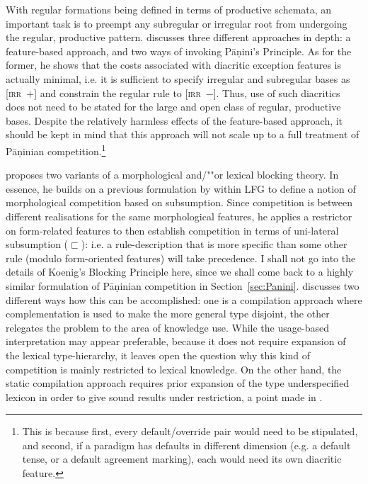 \documentclass[output=paper
                ,modfonts
                ,nonflat
	        ,collection
	        ,collectionchapter
	        ,collectiontoclongg
 	        ,biblatex
                ,babelshorthands
                ,newtxmath
                ,draftmode
                ,colorlinks, citecolor=brown
]{./langsci/langscibook}
\begin{document}
{With regular formations being defined in terms of productive schemata,
an important task is to preempt any subregular or irregular root from
undergoing the regular, productive pattern. \citet{Koenig99} discusses
three different approaches in depth: a feature-based approach, and two
ways of invoking Pāṇini's Principle. As for the former, he shows that
the costs associated with diacritic exception features is actually
minimal, i.e. it is sufficient to specify irregular and subregular
bases as \textsc{[irr~$+$]} and constrain the regular rule to
\textsc{[irr~$-$]}. Thus, use of such diacritics does not need to be
stated for the large and open class of regular, productive
bases. Despite the relatively harmless effects of the feature-based
approach, it should be kept in mind that this approach will not scale
up to a full treatment of Pāṇinian competition.\footnote{This is
  because first, every default/override pair would need to be
  stipulated, and second, if a paradigm has defaults in different
  dimension (e.g. a default tense, or a default agreement marking),
  each would need its own diacritic feature.}

\citet{Koenig99} proposes two variants of a morphological and/""or lexical blocking
theory. In essence, he builds on a previous formulation by
\citet{Andrews90} within LFG to define a notion of morphological
competition based on subsumption. Since competition is between
different realisations for the same morphological features, he applies
a restrictor on form-related features to then establish competition in
terms of uni-lateral subsumption ($\sqsubset$): i.e. a
rule-description that is more specific than some other rule (modulo
form-oriented features) will take precedence. I shall not go into the
details of Koenig's Blocking Principle here, since we shall come back
to a highly similar formulation of Pāṇinian competition in
Section~\ref{sec:Panini}.  \citet{Koenig99} discusses two different
ways how this can be accomplished: one is a compilation approach where
complementation is used to make the more general type disjoint, the
other relegates the problem to the area of knowledge use. While the
usage-based interpretation may appear preferable, because it does not
require expansion of the lexical type-hierarchy, it leaves open the
question why this kind of competition is mainly restricted to lexical
knowledge. On the other hand, the static compilation approach requires
prior expansion of the type underspecified lexicon in order to give
sound results under restriction, a point made in
\citet{crysmann_b03book}.

}
\end{document}
